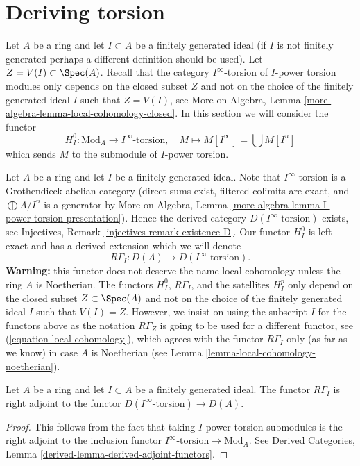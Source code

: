 \section{Deriving torsion}
\label{section-bad-local-cohomology}

\noindent
Let $A$ be a ring and let $I \subset A$ be a finitely generated ideal
(if $I$ is not finitely generated perhaps a different definition
should be used). Let $Z = V(I) \subset \Spec(A)$. Recall that the
category $I^\infty\text{-torsion}$ of $I$-power torsion modules
only depends on the closed subset $Z$ and not on the choice of the
finitely generated ideal $I$ such that $Z = V(I)$, see
More on Algebra, Lemma \ref{more-algebra-lemma-local-cohomology-closed}.
In this section we will consider the functor
$$
H^0_{I} : \text{Mod}_A \longrightarrow I^\infty\text{-torsion},\quad
M \longmapsto M[I^\infty] = \bigcup M[I^n]
$$
which sends $M$ to the submodule of $I$-power torsion.

\medskip\noindent
Let $A$ be a ring and let $I$ be a finitely generated ideal.
Note that $I^\infty\text{-torsion}$ is a Grothendieck
abelian category (direct sums exist, filtered colimits are
exact, and $\bigoplus A/I^n$ is a generator by
More on Algebra, Lemma \ref{more-algebra-lemma-I-power-torsion-presentation}).
Hence the derived category $D(I^\infty\text{-torsion})$ exists, see
Injectives, Remark \ref{injectives-remark-existence-D}.
Our functor $H^0_I$ is left exact and has a derived extension
which we will denote
$$
R\Gamma_I : D(A) \longrightarrow D(I^\infty\text{-torsion}).
$$
{\bf Warning:} this functor does not deserve the name
local cohomology unless the ring $A$ is Noetherian.
The functors $H^0_I$, $R\Gamma_I$, and the satellites $H^p_I$
only depend on the closed subset $Z \subset \Spec(A)$ and not
on the choice of the finitely generated ideal $I$ such that
$V(I) = Z$. However, we insist on using the subscript $I$ for
the functors above as the notation $R\Gamma_Z$ is going
to be used for a different functor, see
(\ref{equation-local-cohomology}), which
agrees with the functor $R\Gamma_I$ only (as far as we know)
in case $A$ is Noetherian
(see Lemma \ref{lemma-local-cohomology-noetherian}).

\begin{lemma}
\label{lemma-adjoint}
Let $A$ be a ring and let $I \subset A$ be a finitely generated ideal.
The functor $R\Gamma_I$ is right adjoint to the functor
$D(I^\infty\text{-torsion}) \to D(A)$.
\end{lemma}

\begin{proof}
This follows from the fact that taking $I$-power torsion submodules
is the right adjoint to the inclusion functor
$I^\infty\text{-torsion} \to \text{Mod}_A$. See
Derived Categories, Lemma \ref{derived-lemma-derived-adjoint-functors}.
\end{proof}

